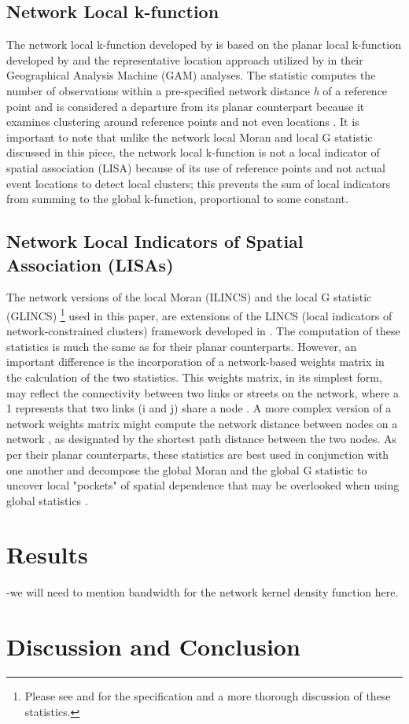 \documentclass[12pt, letterpaper]{article}
\begin{document}
\subsection{Network Local k-function}
The network local k-function developed by \citep{yamada2007local} is based on the planar local k-function developed by \citet{getisfranklin1987second} and the representative location approach utilized by \citep{openshaw1987mark} in their Geographical Analysis Machine (GAM) analyses. The statistic computes the number of observations within a pre-specified network distance \emph{h} of a reference point \citep{yamada2007local} and is considered a departure from its planar counterpart because it examines clustering around reference points and not even locations \citep{yamada2007local}. It is important to note that unlike the network local Moran and local G statistic discussed in this piece, the network local k-function is not a local indicator of spatial association (LISA) because of its use of reference points and not actual event locations to detect local clusters; this prevents the sum of local indicators from summing to the global k-function, proportional to some constant. \citep{yamada2007local}


\subsection{Network Local Indicators of Spatial Association (LISAs)}
The network versions of the local Moran (ILINCS) and the local G statistic (GLINCS) \footnote[1]{Please see \citet{anselin1995local} and \citet{getisord1992distance} for the specification and a more thorough discussion of these statistics.} used in this paper, are extensions of the LINCS (local indicators of network-constrained clusters) framework developed in \citet{yamada2007local}. The computation of these statistics is much the same as for their planar counterparts. However, an important difference is the incorporation of a network-based weights matrix in the calculation of the two statistics. This weights matrix, in its simplest form, may reflect the connectivity between two links or streets on the network, where a 1 represents that two links (i and j) share a node \citep{yamada2010local}. A more complex version of a network weights matrix might compute the network distance between nodes on a network \citep{yamada2010local}, as designated by the shortest path distance between the two nodes. As per their planar counterparts, these statistics are best used in conjunction with one another and decompose the global Moran \citep{moran1948interpretation} and the global G statistic \citep{getisord1992distance} to uncover local "pockets" of spatial dependence that may be overlooked when using global statistics \citep{getis2010analysis}. %

\section{Results}
-we will need to mention bandwidth for the network kernel density function here.

\section{Discussion and Conclusion}

\newpage
{}


\end{document}
